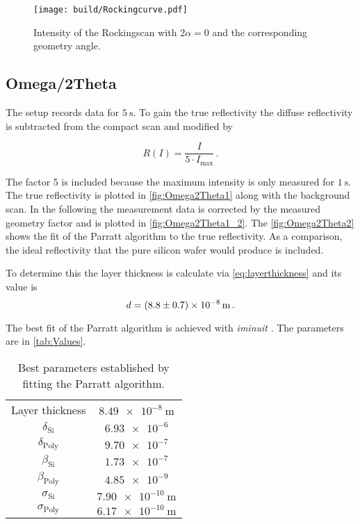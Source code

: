 \begin{figure}[H]
    \centering
    \texttt{[image: build/Rockingcurve.pdf]}
    \caption{Intensity of the Rockingscan with $2\alpha = 0$ and the corresponding geometry angle.} 
    \label{fig:Rockingscan}
\end{figure}

\subsection{Omega/2Theta}
 
The setup records data for $ \SI{5}{\second}$.
To gain the true reflectivity the diffuse reflectivity is subtracted from the compact scan and modified by

\begin{equation*}
    R(I) =   \frac{I}{5 \cdot I_\text{max}}\,.
\end{equation*}

The factor 5 is included because the maximum intensity is only measured for $\SI{1}{\second}$.
The true reflectivity is plotted in \autoref{fig:Omega2Theta1} along with the background scan.
In the following the measurement data is corrected by the measured geometry factor and is plotted in \autoref{fig:Omega2Theta1_2}.
The \autoref{fig:Omega2Theta2} shows the fit of the Parratt algorithm to the true reflectivity.
As a comparison, the ideal reflectivity that the pure silicon wafer would produce is included.




To determine this the layer thickness is calculate via \autoref{eq:layerthickness} and its value is
\begin{equation*}
    d = \SI{8.8 \pm 0.7e-08}{\meter}\,.
\end{equation*}

The best fit of the Parratt algorithm is achieved with \textit{iminuit} \cite{iminuit}.
The parameters are in \autoref{tab:Values}.


\begin{table}[H]
    \centering
    \caption{Best parameters established by fitting the Parratt algorithm.}
    \label{tab:Values}
    \begin{tabular}{c  c}
    \midrule
          {Layer thickness}         &  $\SI{8.49e-8}{\meter}$  \\    
          {$\delta_{\text{Si}}$}    &  $\num{6.93e-6}$          \\    
          {$\delta_\text{Poly}$}    &  $\num{9.70e-7}$          \\    
          {$\beta_\text{Si}$}        &  $\num{1.73e-7}$          \\    
          {$\beta_\text{Poly}$}     &  $\num{4.85e-9}$          \\    
          {$\sigma_\text{Si}$}      &  $\SI{7.90e-10}{\meter}$  \\    
          {$\sigma_{\text{Poly}}$}   &  $\SI{6.17e-10}{\meter}$  \\    
    \bottomrule
    \end{tabular}
\end{table}




